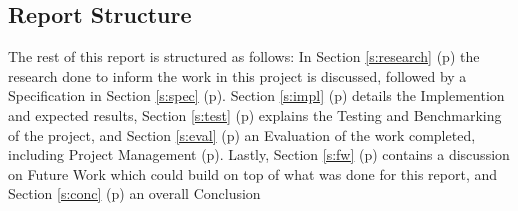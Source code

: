 \subsection{Report Structure}
The rest of this report is structured as follows: In Section \ref{s:research} (p\pageref{s:research}) the research done to inform the work in this project is discussed, followed by a Specification in Section \ref{s:spec} (p\pageref{s:spec}).
Section \ref{s:impl} (p\pageref{s:impl}) details the Implemention and expected results, Section \ref{s:test} (p\pageref{s:test}) explains the Testing and Benchmarking of the project, and Section \ref{s:eval} (p\pageref{s:eval}) an Evaluation of the work completed, including Project Management (p\pageref{ss:pm}).
 Lastly, Section \ref{s:fw} (p\pageref{s:fw}) contains a discussion on Future Work which could build on top of what was done for this report, and Section \ref{s:conc} (p\pageref{s:conc}) an overall Conclusion
